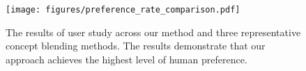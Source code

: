 \begin{figure}[t]
\label{user_study}
\begin{center}
\centerline{\texttt{[image: figures/preference\_rate\_comparison.pdf]}}  %
\caption{The results of user study across our method and three representative concept blending methods. The results demonstrate that our approach achieves the highest level of human preference. }
\label{failure}
\end{center}
\vskip -0.4in
\end{figure}
